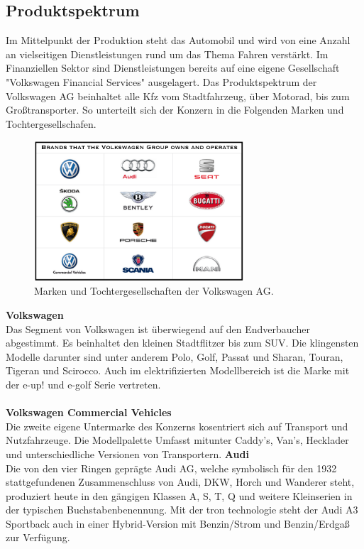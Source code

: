 \documentclass[12pt]{article}
\begin{document}
\subsection{Produktspektrum}
Im Mittelpunkt der Produktion steht das Automobil und wird von eine Anzahl an vielseitigen Dienstleistungen rund um das Thema Fahren verstärkt. Im Finanziellen Sektor sind Dienstleistungen bereits auf eine eigene Gesellschaft "Volkswagen Financial Services" ausgelagert.
Das Produktspektrum der Volkswagen AG beinhaltet alle Kfz vom Stadtfahrzeug, über Motorad, bis zum Großtransporter.
So unterteilt sich der Konzern in die Folgenden Marken und Tochtergesellschafen.\\
\begin{figure}[here!]
\centering
\includegraphics[width=0.7\textwidth]{images/Volkswagen-Group-Brands}
\caption{Marken und Tochtergesellschaften der Volkswagen AG. \cite{marken}}
\end{figure}\FloatBarrier
\noindent
\textbf{Volkswagen}\\
Das Segment von Volkswagen ist überwiegend auf den Endverbaucher abgestimmt. Es beinhaltet den kleinen Stadtflitzer bis zum SUV. Die klingensten Modelle darunter sind unter anderem Polo, Golf, Passat und Sharan, Touran, Tigeran und Scirocco.
Auch im elektrifizierten Modellbereich ist die Marke mit der e-up! und e-golf Serie vertreten.\\
\\
\textbf{Volkswagen Commercial Vehicles}\\
Die zweite eigene Untermarke des Konzerns kosentriert sich auf Transport und Nutzfahrzeuge. Die Modellpalette Umfasst mitunter Caddy's, Van's, Hecklader und unterschiedliche Versionen von Transportern.
\newpage
\textbf{Audi}\\
Die von den vier Ringen geprägte Audi AG, welche symbolisch für den 1932 stattgefundenen Zusammenschluss von
Audi, DKW, Horch und Wanderer steht, produziert heute in den gängigen Klassen A, S, T, Q und weitere Kleinserien in der typischen Buchstabenbenennung. Mit der tron technologie steht der Audi A3 Sportback auch in einer Hybrid-Version mit Benzin/Strom und Benzin/Erdgaß zur Verfügung.
\end{document}
